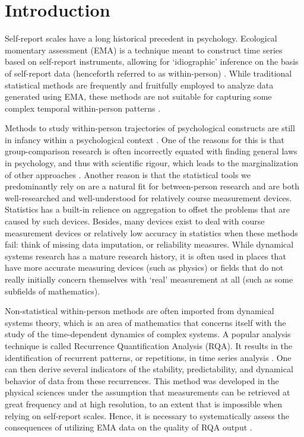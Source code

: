 \documentclass[utf8]{FrontiersinVancouver}
\begin{document}
\section{Introduction}
Self-report scales have a long historical precedent in psychology. Ecological momentary assessment (EMA) is a technique meant to construct time series based on self-report instruments, allowing for `idiographic' inference on the basis of self-report data (henceforth referred to as within-person) \citep{connerExperienceSamplingMethods2009}. While traditional statistical methods are frequently and fruitfully employed to analyze data generated using EMA, these methods are not suitable for capturing some complex temporal within-person patterns \citep{olthofPsychologicalDynamicsAre2020}. 

Methods to study within-person trajectories of psychological constructs are still in infancy within a psychological context \citep{molenaarManifestoPsychologyIdiographic2004}. One of the reasons for this is that group-comparison research is often incorrectly equated with finding general laws in psychology, and thus with scientific rigour, which leads to the marginalization of other approaches \citep{hamakerWhyResearchersShould2012, lamiellProblemIndividualityScientific2021}. Another reason is that the statistical tools we predominantly rely on are a natural fit for between-person research and are both well-researched and well-understood for relatively course measurement devices. Statistics has a built-in relience on aggregation to offset the problems that are caused by such devices. Besides, many devices exist to deal with course measurement devices or relatively low accuracy in statistics when these methods fail: think of missing data imputation, or reliability measures. While dynamical systems research has a mature research history, it is often used in places that have more accurate measuring devices (such as physics) or fields that do not really initially concern themselves with `real' measurement at all (such as some subfields of mathematics). 

Non-statistical within-person methods are often imported from dynamical systems theory, which is an area of mathematics that concerns itself with the study of the time-dependent dynamics of complex systems. A popular analysis technique is called Recurrence Quantification Analysis (RQA). It results in the identification of recurrent patterns, or repetitions, in time series analysis \citep{webber2005recurrence}. One can then derive several indicators of the stability, predictability, and dynamical behavior of data from these recurrences. This method was developed in the physical sciences under the assumption that measurements can be retrieved at great frequency and at high resolution, to an extent that is impossible when relying on self-report scales. Hence, it is necessary to systematically assess the consequences of utilizing EMA data on the quality of RQA output \citep{haslbeckRecoveringWithinpersonDynamics2022}. 
\end{document}
